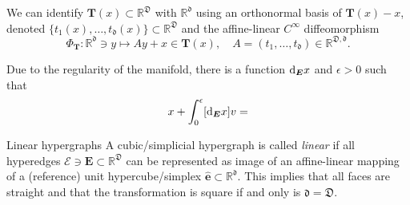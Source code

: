 \documentclass[a4paper, english, 12pt, reqno, draft]{amsart}
\makeatletter
\theoremstyle{definition}
\theoremstyle{remark}
\numberwithin{equation}{section}
\newcommand{\SetEdge}{\ensuremath{\boldsymbol{\mathcal E}}}
\newcommand{\Edge}{{\ensuremath{\boldsymbol E}}}
\newcommand{\RefEdge}{{\ensuremath{\widehat{\boldsymbol e}}}}
\newcommand{\locDim}{\ensuremath{\mathfrak d}}
\newcommand{\globDim}{\ensuremath{\mathfrak D}}
\newcommand{\Der}{\ensuremath{\textup d_\Edge}}
\newcommand{\tangent}{\ensuremath{{\boldsymbol T}}}
\newcommand{\tangentMapping}{\ensuremath{\Phi_\tangent}}
\newcommand{\IR}{\ensuremath{\mathbb R}}
\def\paragraph{\@startsection{paragraph}{4}%
  \z@\z@{-\fontdimen2\font}%
  {\normalfont\scshape}}
\makeatother
\begin{document}
We can identify $\tangent(x) \subset \IR^\globDim$ with $\IR^\locDim$ using an orthonormal basis of $\tangent(x) - x$, denoted $\{t_1(x), \ldots, t_\locDim (x)\} \subset \IR^\globDim$ and the affine-linear $C^\infty$ diffeomorphism
% 
\begin{equation*}
 \tangentMapping: \IR^\locDim \ni y \mapsto A y + x \in \tangent(x), \quad A = (t_1, \ldots, t_\locDim) \in \IR^{\globDim,\locDim}. 
\end{equation*}
% 

Due to the regularity of the manifold, there is a function $\Der x$ and $\epsilon > 0$ such that
% 
\begin{equation*}
 x + \int_0^\epsilon [\Der x] v = 
\end{equation*}


\paragraph{Linear hypergraphs}
% 
A cubic/simplicial hypergraph is called \emph{linear} if all hyperedges $\SetEdge \ni \Edge \subset \IR^\globDim$ can be represented as image of an affine-linear mapping of a (reference) unit hypercube/simplex $\RefEdge \subset \IR^\locDim$. This implies that all faces are straight and that the transformation is square if and only is $\locDim = \globDim$.
\end{document}
